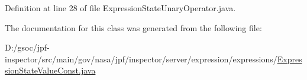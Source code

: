 Definition at line 28 of file Expression\+State\+Unary\+Operator.\+java.



The documentation for this class was generated from the following file\+:\begin{DoxyCompactItemize}
\item 
D\+:/gsoc/jpf-\/inspector/src/main/gov/nasa/jpf/inspector/server/expression/expressions/\hyperlink{_expression_state_value_const_8java}{Expression\+State\+Value\+Const.\+java}\end{DoxyCompactItemize}
